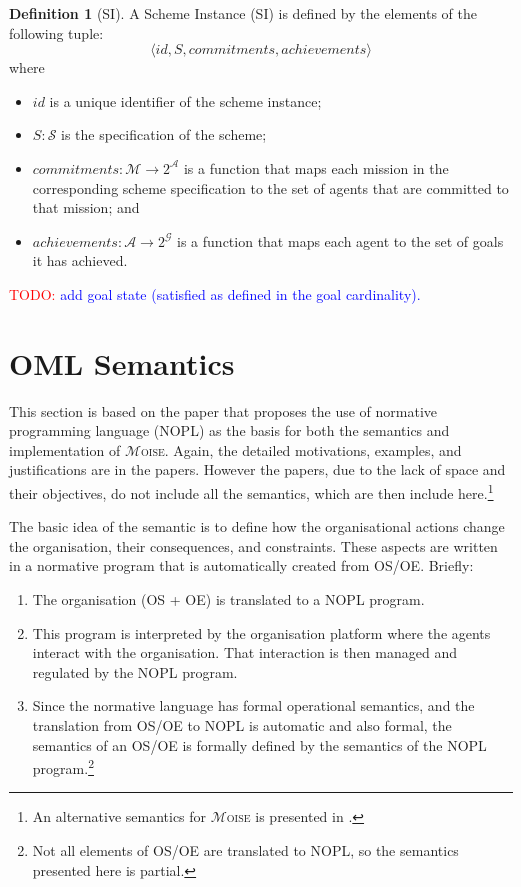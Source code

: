 \documentclass{article}
\newcommand{\moise}{{$\mathcal{M}$\textsc{oise}}\xspace}
\newcommand{\todo}[1]{\textcolor{red}{TODO: }\textcolor{blue}{#1}}
\newcommand{\set}[1]{\mathcal{#1}}
\theoremstyle{definition} \newtheorem{definition}{Definition}
\begin{document}
\begin{definition}[SI]
  A Scheme Instance (SI) is defined by the elements of the following tuple:
  \begin{displaymath}
    \langle id, S, commitments, achievements \rangle
  \end{displaymath}
  where
  \begin{itemize}
  \item $id$ is a unique identifier of the scheme instance;
  \item $S : \set{S}$ is the specification of the scheme;
  \item $commitments : \mathcal{M} \rightarrow 2^{\mathcal{A}}$ is  a
    function that maps each mission in the corresponding scheme
    specification to the set of agents that are committed to that
    mission; and
  \item $achievements : \mathcal{A} \rightarrow 2^{\mathcal{G}}$ is a
    function that maps each agent to the set of goals it has achieved.
  \end{itemize}
\end{definition}

\todo{add goal state (satisfied as defined in the goal cardinality).}


\section{OML Semantics} \label{sec:sem}

This section is based on the paper \cite{hubner:09e} that proposes the
use of normative programming language (NOPL) as the basis for both the
semantics and implementation of \moise. Again, the detailed
motivations, examples, and justifications are in the papers. However
the papers, due to the lack of space and their objectives, do not
include all the semantics, which are then include here.\footnote{An
  alternative semantics for \moise is presented in \cite{birna:10}.}

The basic idea of the semantic is to define how the organisational
actions change the organisation, their consequences, and constraints.
These aspects are written in a normative program that is automatically
created from OS/OE. Briefly:
\begin{enumerate}
\item The organisation (OS + OE) is translated to a NOPL program.
\item This program is interpreted by the organisation platform where
  the agents interact with the organisation. That interaction is then
  managed and regulated by the NOPL program.
\item Since the normative language has formal operational semantics,
  and the translation from OS/OE to NOPL is automatic and also formal,
  the semantics of an OS/OE is formally defined by the semantics of
  the NOPL program.\footnote{Not all elements of OS/OE are translated
    to NOPL, so the semantics presented here is partial.}
\end{enumerate}
\end{document}
